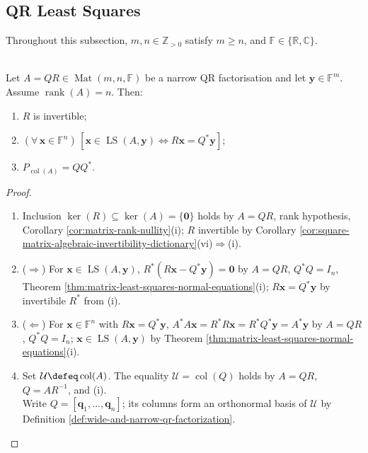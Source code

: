 \subsection{QR Least Squares}

Throughout this subsection, $m,n\in\mathbb{Z}_{>0}$ satisfy $m\geq n$, and $\mathbb{F}\in\{\mathbb{R},\mathbb{C}\}$.

\begin{proposition} \label{prop:qr-least-squares-and-projection} \\
Let $A=QR\in\operatorname{Mat}(m,n,\mathbb{F})$ be a narrow QR factorisation and let $\mathbf{y}\in\mathbb{F}^m$. Assume $\operatorname{rank}(A)=n$. Then:
\begin{enumerate}[label=(\roman*)]
\setlength{\itemsep}{0pt}
\item $R$ is invertible;
\item $(\forall\,\mathbf{x}\in\mathbb{F}^n)\,[\mathbf{x}\in\operatorname{LS}(A,\mathbf{y})\Longleftrightarrow R\mathbf{x}=Q^*\mathbf{y}]$;
\item $P_{\operatorname{col}(A)}=QQ^*$.
\end{enumerate}
\begin{proof}
\begin{enumerate}[label=(\roman*)]
\setlength{\itemsep}{0pt}
\item[$(i)$] Inclusion $\ker(R)\subseteq\ker(A)=\{\mathbf{0}\}$ holds by $A=QR$, rank hypothesis, Corollary \ref{cor:matrix-rank-nullity}(i); $R$ invertible by Corollary \ref{cor:square-matrix-algebraic-invertibility-dictionary}(vi)$\Rightarrow$(i).
\item[$(ii)$] ($\Rightarrow$) For $\mathbf{x}\in\operatorname{LS}(A,\mathbf{y})$, $R^*(R\mathbf{x}-Q^*\mathbf{y})=\mathbf{0}$ by $A=QR$, $Q^*Q=I_n$, Theorem \ref{thm:matrix-least-squares-normal-equations}(i); $R\mathbf{x}=Q^*\mathbf{y}$ by invertibile $R^*$ from (i).
\item[$(ii)$] ($\Leftarrow$) For $\mathbf{x}\in\mathbb{F}^n$ with $R\mathbf{x}=Q^*\mathbf{y}$, $A^*A\mathbf{x}=R^*R\mathbf{x}=R^*Q^*\mathbf{y}=A^*\mathbf{y}$ by $A=QR$, $Q^*Q=I_n$; $\mathbf{x}\in\operatorname{LS}(A,\mathbf{y})$ by Theorem \ref{thm:matrix-least-squares-normal-equations}(i).
\item[$(iii)$] Set $\mathcal{U}\defeq\operatorname{col}(A)$. The equality $\mathcal{U}=\operatorname{col}(Q)$ holds by $A=QR$, $Q=AR^{-1}$, and (i).\\
Write $Q=[\mathbf{q}_1,\ldots,\mathbf{q}_n]$; its columns form an orthonormal basis of $\mathcal{U}$ by Definition \ref{def:wide-and-narrow-qr-factorization}.\\

\end{enumerate}
\end{proof}
\end{proposition}
